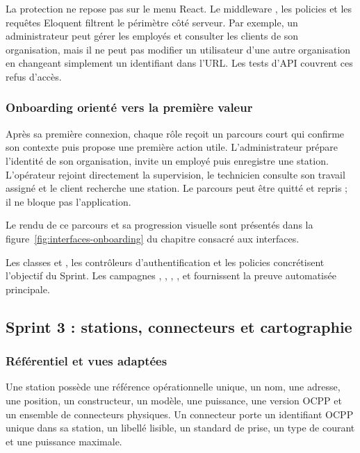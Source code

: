 La protection ne repose pas sur le menu React. Le middleware
, les policies et les requêtes Eloquent
filtrent le périmètre côté serveur. Par exemple, un administrateur peut gérer les
employés et consulter les clients de son organisation, mais il ne peut pas
modifier un utilisateur d'une autre organisation en changeant simplement un
identifiant dans l'URL. Les tests d'API couvrent ces refus d'accès.

\subsubsection{Onboarding orienté vers la première valeur}

Après sa première connexion, chaque rôle reçoit un parcours court qui confirme son
contexte puis propose une première action utile. L'administrateur prépare
l'identité de son organisation, invite un employé puis enregistre une station.
L'opérateur rejoint directement la supervision, le technicien consulte son
travail assigné et le client recherche une station. Le parcours peut être quitté
et repris ; il ne bloque pas l'application.

Le rendu de ce parcours et sa progression visuelle sont présentés dans la
figure~\ref{fig:interfaces-onboarding} du chapitre consacré aux interfaces.

Les classes  et
, les contrôleurs d'authentification et les
policies concrétisent l'objectif du Sprint. Les campagnes
, ,
, ,
 et
 fournissent la preuve automatisée principale.

\subsection{Sprint 3 : stations, connecteurs et cartographie}

\subsubsection{Référentiel et vues adaptées}

Une station possède une référence opérationnelle unique, un nom, une adresse, une
position, un constructeur, un modèle, une puissance, une version OCPP et un
ensemble de connecteurs physiques. Un connecteur porte un identifiant OCPP unique
dans sa station, un libellé lisible, un standard de prise, un type de courant et
une puissance maximale.

